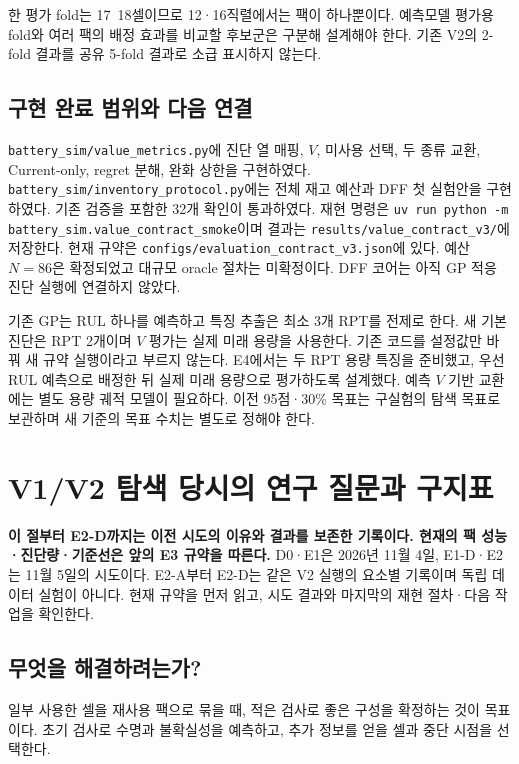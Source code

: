\documentclass[11pt,a4paper]{article}
\newcommand{\file}[1]{{\small\nolinkurl{#1}}}
\begin{document}
한 평가 fold는 17~18셀이므로 12·16직렬에서는 팩이 하나뿐이다. 예측모델 평가용 fold와 여러 팩의 배정 효과를 비교할 후보군은 구분해 설계해야 한다. 기존 V2의 2-fold 결과를 공유 5-fold 결과로 소급 표시하지 않는다.

\subsection*{구현 완료 범위와 다음 연결}
\file{battery_sim/value_metrics.py}에 진단 열 매핑, $V$, 미사용 선택, 두 종류 교환, Current-only, regret 분해, 완화 상한을 구현하였다. \file{battery_sim/inventory_protocol.py}에는 전체 재고 예산과 DFF 첫 실험안을 구현하였다. 기존 검증을 포함한 32개 확인이 통과하였다. 재현 명령은 \file{uv run python -m battery_sim.value_contract_smoke}이며 결과는 \file{results/value_contract_v3/}에 저장한다. 현재 규약은 \file{configs/evaluation_contract_v3.json}에 있다. 예산 $N=86$은 확정되었고 대규모 oracle 절차는 미확정이다. DFF 코어는 아직 GP 적응 진단 실행에 연결하지 않았다.

기존 GP는 RUL 하나를 예측하고 특징 추출은 최소 3개 RPT를 전제로 한다. 새 기본 진단은 RPT 2개이며 $V$ 평가는 실제 미래 용량을 사용한다. 기존 코드를 설정값만 바꿔 새 규약 실행이라고 부르지 않는다. E4에서는 두 RPT 용량 특징을 준비했고, 우선 RUL 예측으로 배정한 뒤 실제 미래 용량으로 평가하도록 설계했다. 예측 $V$ 기반 교환에는 별도 용량 궤적 모델이 필요하다. 이전 95점·30\% 목표는 구실험의 탐색 목표로 보관하며 새 기준의 목표 수치는 별도로 정해야 한다.




\clearpage
\section{V1/V2 탐색 당시의 연구 질문과 구지표}
\textbf{이 절부터 E2-D까지는 이전 시도의 이유와 결과를 보존한 기록이다. 현재의 팩 성능·진단량·기준선은 앞의 E3 규약을 따른다.}
D0·E1은 2026년 11월 4일, E1-D·E2는 11월 5일의 시도이다. E2-A부터 E2-D는 같은 V2 실행의 요소별 기록이며 독립 데이터 실험이 아니다. 현재 규약을 먼저 읽고, 시도 결과와 마지막의 재현 절차·다음 작업을 확인한다.

\subsection*{무엇을 해결하려는가?}
일부 사용한 셀을 재사용 팩으로 묶을 때, 적은 검사로 좋은 구성을 확정하는 것이 목표이다. 초기 검사로 수명과 불확실성을 예측하고, 추가 정보를 얻을 셀과 중단 시점을 선택한다.
\end{document}
